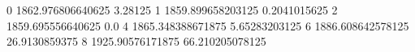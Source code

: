 0 1862.976806640625 3.28125
1 1859.899658203125 0.2041015625
2 1859.695556640625 0.0
4 1865.348388671875 5.65283203125
6 1886.608642578125 26.9130859375
8 1925.90576171875 66.210205078125
